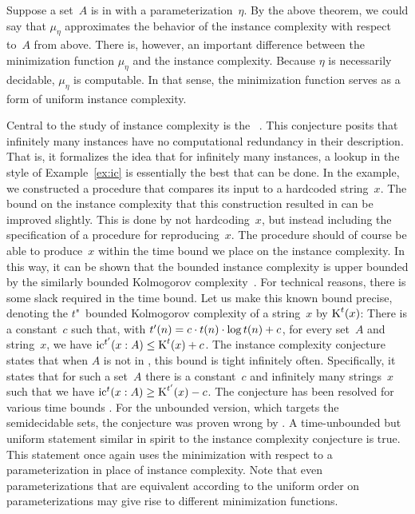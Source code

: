 Suppose a set~$A$ is in  with a parameterization~$\eta$.
By the above theorem, we could say that $\mu_\eta$ approximates the behavior of the instance complexity with respect to~$A$ from above.
There is, however, an important difference between the minimization function $\mu_\eta$ and the instance complexity.
Because $\eta$ is necessarily decidable, $\mu_\eta$ is computable.
In that sense, the minimization function serves as a form of uniform instance complexity.

Central to the study of instance complexity is the ~\parencite{orponen1994instance}.
This conjecture posits that infinitely many instances have no computational redundancy in their description.
That is, it formalizes the idea that for infinitely many instances, a lookup in the style of Example~\ref{ex:ic} is essentially the best that can be done.
In the example, we constructed a procedure that compares its input to a hardcoded string~$x$.
The bound on the instance complexity that this construction resulted in can be improved slightly.
This is done by not hardcoding~$x$, but instead including the specification of a procedure for reproducing~$x$.
The procedure should of course be able to produce~$x$ within the time bound we place on the instance complexity.
In this way, it can be shown that the bounded instance complexity is upper bounded by the similarly bounded Kolmogorov complexity~\parencite{orponen1994instance,li2008introduction}.
For technical reasons, there is some slack required in the time bound.
Let us make this known bound precise, denoting the $t$"~bounded Kolmogorov complexity of a string~$x$ by $\operatorname{K}^t(x)$:
There is a constant~$c$ such that, with $t'(n) = c \cdot t(n) \cdot \log t(n) + c$, for every set~$A$ and string~$x$, we have $\operatorname{ic}^{t'}(x : A) \le \operatorname{K}^t(x) + c$.
The instance complexity conjecture states that when $A$ is not in , this bound is tight infinitely often.
Specifically, it states that for such a set~$A$ there is a constant~$c$ and infinitely many strings~$x$ such that we have $\operatorname{ic}^t(x : A) \ge \operatorname{K}^{t'}(x) - c$.
The conjecture has been resolved for various time bounds \parencite{fortnow1996resource,buhrman1996random}.
For the unbounded version, which targets the semidecidable sets, the conjecture was proven wrong by \textcite{kummer1996kolmogorov}.
A time-unbounded but uniform statement similar in spirit to the instance complexity conjecture is true.
This statement once again uses the minimization with respect to a parameterization in place of instance complexity.
Note that even parameterizations that are equivalent according to the uniform order on parameterizations may give rise to different minimization functions.
